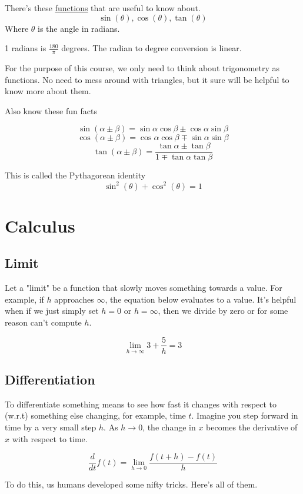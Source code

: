 \documentclass[
]{article}
\let\oldhyperref\hyperref
\renewcommand{\hyperref}[2][]{\oldhyperref[#1]{\underline{#2}}}
\providecommand{\rarr}{\rightarrow}
\providecommand{\infin}{\infty}
\begin{document}
There's these \hyperref[functions]{functions} that are useful to know about.
\[
	\sin(\theta), \cos(\theta), \tan(\theta)
\]
Where \(\theta\) is the angle in radians.

1 radians is \(\frac{180}{\pi}\) degrees. The radian to degree conversion is linear.

For the purpose of this course, we only need to think about trigonometry as functions. No need to mess around with triangles, but it sure will be helpful to know more about them.

Also know these fun facts

\[
	\sin(\alpha\pm \beta) = \sin\alpha\cos\beta \pm \cos\alpha\sin\beta
\]
\[
	\cos(\alpha\pm \beta) = \cos\alpha\cos\beta \mp \sin\alpha\sin\beta
\]
\[
	\tan(\alpha\pm \beta) = \frac{\tan\alpha \pm \tan\beta}{1 \mp \tan\alpha\tan\beta}
\]

This is called the Pythagorean identity
\[
	\sin^2(\theta) + \cos^2(\theta) = 1
\]

\section{Calculus}\label{calculus}
\subsection{Limit}\label{limits}
Let a "limit" be a function that slowly moves something towards a value. For example, if \(h\) approaches \(\infin\), the equation below evaluates to a value. It's helpful when if we just simply set \(h=0\) or \(h=\infin\), then we divide by zero or for some reason can't compute \(h\).

\[
	\lim_{h\to \infin} 3+\frac{5}{h}=3
\]

\subsection{Differentiation}\label{differentiation}

To differentiate something means to see how fast it changes with respect
to (w.r.t) something else changing, for example, time \(t\). Imagine you step forward in time by a very small step \(h\).
As \(h\rarr 0\), the change in \(x\) becomes the derivative of \(x\) with respect to time.

\[
	\frac{d}{dt}f(t)=\lim_{h\to 0} \frac{f(t+h)-f(t)}{h}
\]

To do this, us humans developed some nifty tricks. Here's all of them.
\end{document}
